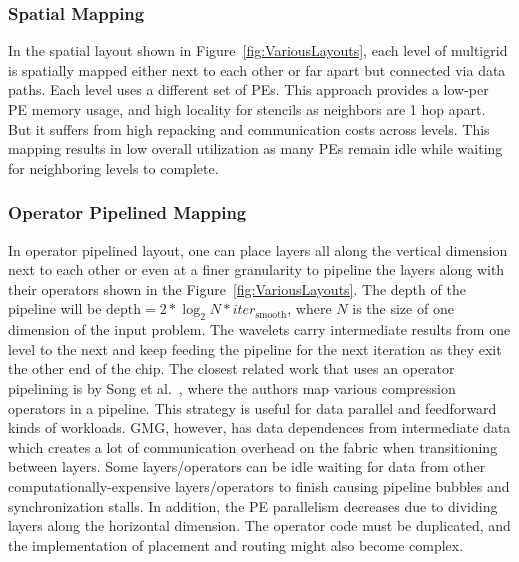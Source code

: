 \documentclass[sigconf]{acmart}
\begin{document}

        \subsubsection{Spatial Mapping}
        In the spatial layout shown in Figure~\ref{fig:VariousLayouts}, each level of multigrid is spatially mapped either next to each other or far apart but connected via data paths. Each level uses a different set of PEs. This approach provides a low-per PE memory usage, and high locality for stencils as neighbors are 1 hop apart. But it suffers from high repacking and communication costs across levels. This mapping results in low overall utilization as many PEs remain idle while waiting for neighboring levels to complete. %
       
    \subsubsection{Operator Pipelined Mapping}
            In operator pipelined layout, one can place layers all along the vertical dimension next to each other or even at a finer granularity to pipeline the layers along with their operators shown in the Figure~\ref{fig:VariousLayouts}. The depth of the pipeline will be $\mathrm{depth} = 2 * \log_2 N * iter_{\mathrm{smooth}}$, where $N$ is the size of one dimension of the input problem. The wavelets carry intermediate results from one level to the next and keep feeding the pipeline for the next iteration as they exit the other end of the chip. The closest related work that uses an operator pipelining 
            is by Song et al.~\cite{song_ceresz}, where the authors map various compression operators in a pipeline. This strategy is useful for data parallel and feedforward kinds of workloads. GMG, however, has data dependences from intermediate data which creates a lot of communication overhead on the fabric when transitioning between layers. Some layers/operators can be idle waiting for data from other computationally-expensive layers/operators to finish causing pipeline bubbles and synchronization stalls. In addition, the PE parallelism decreases due to dividing layers along the horizontal dimension. The operator code must be duplicated, and the implementation of placement and routing might also become complex.
\end{document}
